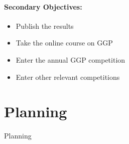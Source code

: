 \paragraph{Secondary Objectives:}
\begin{itemize}
\item Publish the results
\item Take the online course on GGP
\item Enter the annual GGP competition
\item Enter other relevant competitions
\end{itemize}




\section{Planning}

\begin{table}[]
Planning
\end{table}





